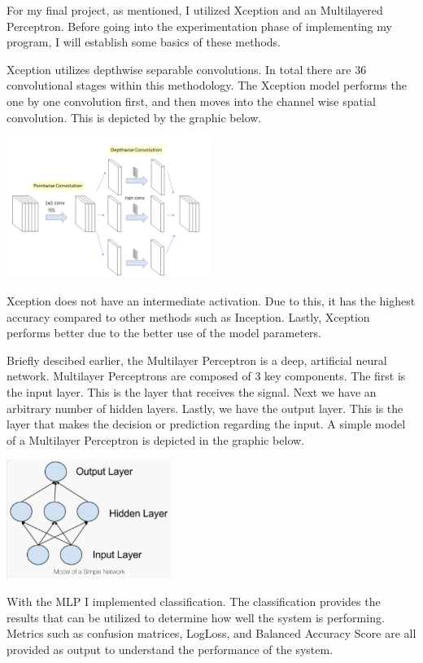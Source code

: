 \documentclass[12pt]{article}
\begin{document}
For my final project, as mentioned, I utilized Xception and an Multilayered Perceptron.  Before going into the experimentation phase of implementing my program, I will establish some basics of these methods.

Xception utilizes depthwise separable convolutions.  In total there are 36 convolutional stages within this methodology.  The Xception model performs the one by one convolution first, and then moves into the channel wise spatial convolution.  This is depicted by the graphic below.
\begin{center}
     \includegraphics[width=0.5\textwidth]{XceptionModel.jpg}
\end{center}
Xception does not have an intermediate activation.  Due to this, it has the highest accuracy compared to other methods such as Inception.  Lastly, Xception performs better due to the better use of the model parameters.

Briefly descibed earlier, the Multilayer Perceptron is a deep, artificial neural network.  Multilayer Perceptrons are composed of 3 key components.  The first is the input layer.  This is the layer that receives the signal.  Next we have an arbitrary number of hidden layers.  Lastly, we have the output layer.  This is the layer that makes the decision or prediction regarding the input.  A simple model of a Multilayer Perceptron is depicted in the graphic below.
\begin{center}
     \includegraphics[width=0.4\textwidth]{MLP.jpg}
\end{center}
With the MLP I implemented classification.  The classification provides the results that can be utilized to determine how well the system is performing.  Metrics such as confusion matrices, LogLoss, and Balanced Accuracy Score are all provided as output to understand the performance of the system.
\end{document}
